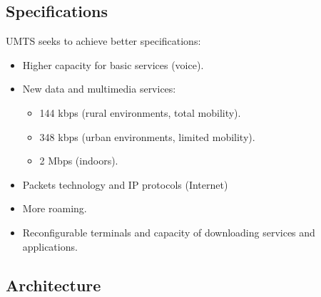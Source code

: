 \documentclass[../main.tex]{subfiles}
\begin{document}
\subsection{Specifications}

UMTS seeks to achieve better specifications:
\begin{itemize}
	\item Higher capacity for basic services (voice).
	\item {
		New data and multimedia services:
		\begin{itemize}
			\item 144 kbps (rural environments, total mobility).
			\item 348 kbps (urban environments, limited mobility).
			\item 2 Mbps (indoors).
		\end{itemize}
	}
	\item Packets technology and IP protocols (Internet)
	\item More roaming.
	\item Reconfigurable terminals and capacity of downloading services and applications.
\end{itemize}

\subsection{Architecture}
\end{document}
